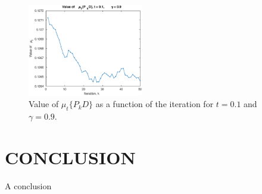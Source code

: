 \documentclass[journal]{IEEEtran}
\begin{document}
\begin{figure}[]
  \centering
  \includegraphics[width=0.45\textwidth]{mu_t.eps}
  \caption{Value of $\mu_t\{P_kD\}$ as a function of the iteration for $t = 0.1$ and $\gamma = 0.9$.}
  \label{fig:intuitive}
\end{figure}

\section{CONCLUSION}

A conclusion



{}
\end{document}
